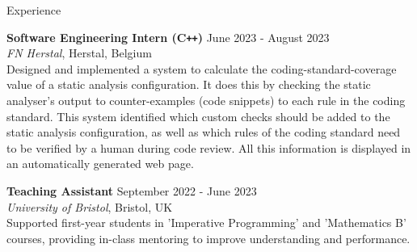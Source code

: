 \documentclass{resume} %
\begin{document}
\begin{rSection}{Experience}

\textbf{Software Engineering Intern (C\texttt{++})} \hfill June 2023 - August 2023 \\
\textit{FN Herstal}, Herstal, Belgium \\
Designed and implemented a system to calculate the coding-standard-coverage value of a static analysis configuration. It does this by checking the static analyser's output to counter-examples (code snippets) to each rule in the coding standard. This system identified which custom checks should be added to the static analysis configuration, as well as which rules of the coding standard need to be verified by a human during code review. All this information is displayed in an automatically generated web page.

\textbf{Teaching Assistant} \hfill September 2022 - June 2023 \\
\textit{University of Bristol}, Bristol, UK \\
Supported first-year students in 'Imperative Programming' and 'Mathematics B' courses, providing in-class mentoring to improve understanding and performance.

\end{rSection}

\end{document}
